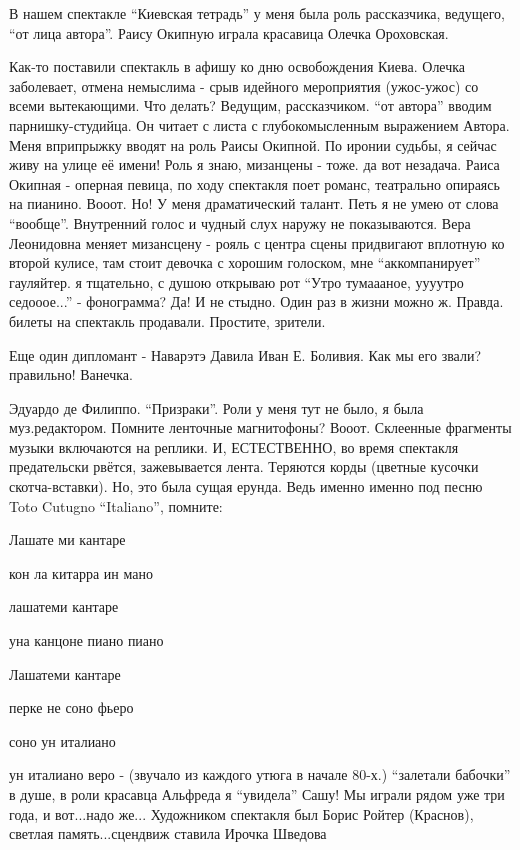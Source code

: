 В нашем спектакле \enquote{Киевская тетрадь} у меня была роль рассказчика, ведущего,
\enquote{от лица автора}.   Раису Окипную играла красавица Олечка Ороховская.

Как-то поставили спектакль в афишу ко дню освобождения Киева. Олечка
заболевает, отмена немыслима - срыв идейного мероприятия (ужос-ужос) со всеми
вытекающими. Что делать? Ведущим, рассказчиком. \enquote{от автора} вводим
парнишку-студийца. Он читает с листа с глубокомысленным выражением Автора. Меня
вприпрыжку вводят на роль Раисы Окипной. По иронии судьбы, я сейчас живу на
улице её имени! Роль я знаю, мизанцены - тоже. да вот незадача. Раиса Окипная -
оперная певица, по ходу спектакля поет романс, театрально опираясь на пианино.
Вооот. Но! У меня драматический талант. Петь я не умею от слова \enquote{вообще}.
Внутренний голос и чудный слух наружу не показываются. Вера Леонидовна меняет
мизансцену - рояль с центра сцены придвигают вплотную ко второй кулисе, там
стоит девочка с хорошим голоском, мне \enquote{аккомпанирует} гауляйтер. я тщательно, с
душою открываю рот \enquote{Утро тумаааное, уууутро седооое...} - фонограмма? Да! И не
стыдно. Один раз в жизни можно ж. Правда. билеты на спектакль продавали.
Простите, зрители.

Еще один дипломант - Наварэтэ Давила Иван Е. Боливия. Как мы его звали?
правильно! Ванечка. 

Эдуардо де Филиппо. \enquote{Призраки}. Роли у меня тут не было, я была муз.редактором.
Помните ленточные магнитофоны? Вооот. Склеенные фрагменты музыки включаются на
реплики. И, ЕСТЕСТВЕННО, во время спектакля предательски рвётся, зажевывается
лента. Теряются корды (цветные кусочки скотча-вставки). Но, это была сущая
ерунда. Ведь именно именно под песню  Toto Cutugno \enquote{Italiano}, помните:

Лашате ми кантаре

кон ла китарра ин мано

лашатеми кантаре

уна канцоне пиано пиано

Лашатеми кантаре

перке не соно фьеро

соно ун италиано

ун италиано веро - (звучало из каждого утюга в начале 80-х.) \enquote{залетали
бабочки} в душе, в роли красавца Альфреда я \enquote{увидела} Сашу! Мы играли
рядом уже три года, и вот...надо же... Художником спектакля был Борис Ройтер
(Краснов), светлая память...сцендвиж ставила Ирочка Шведова

